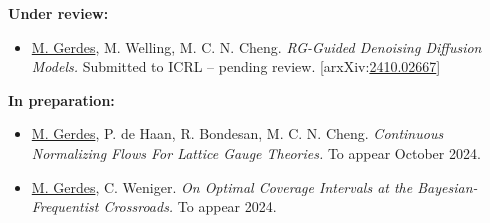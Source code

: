 \documentclass[12pt]{article}
\begin{document}
\vspace{7pt}
\textbf{Under review:}

\begin{itemize}[left=0pt, itemsep=5pt]
    \item \underline{M. Gerdes}, M. Welling, M. C. N. Cheng. \textit{RG-Guided Denoising Diffusion Models.}
    Submitted to ICRL -- pending review.
    [arxXiv:\href{https://arxiv.org/abs/2410.02667}{2410.02667}]
\end{itemize}

\vspace{7pt}
\textbf{In preparation:}

\begin{itemize}[left=0pt, itemsep=5pt]
    \item \underline{M. Gerdes}, P. de Haan, R. Bondesan, M. C. N. Cheng. \textit{Continuous Normalizing Flows For Lattice Gauge Theories.} To appear October 2024.
    \item \underline{M. Gerdes}, C. Weniger. \textit{On Optimal Coverage Intervals at the Bayesian-Frequentist Crossroads.} To appear 2024.
\end{itemize}
\end{document}
